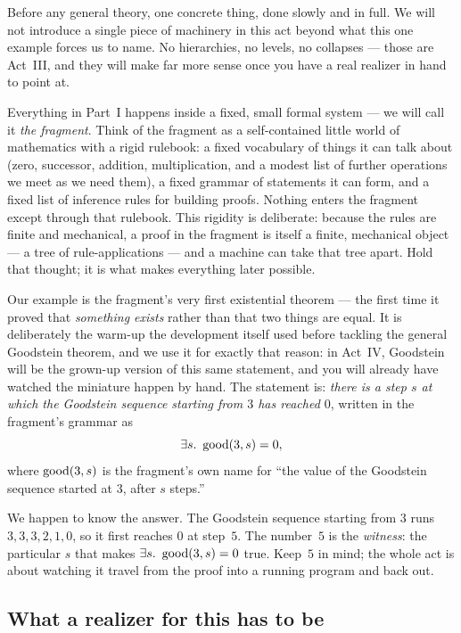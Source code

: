 \documentclass[11pt]{article}
\begin{document}
Before any general theory, one concrete thing, done slowly and in full. We
will not introduce a single piece of machinery in this act beyond what this
one example forces us to name. No hierarchies, no levels, no collapses ---
those are Act~III, and they will make far more sense once you have a real
realizer in hand to point at.

Everything in Part~I happens inside a fixed, small formal system --- we
will call it \emph{the fragment}. Think of the fragment as a self-contained
little world of mathematics with a rigid rulebook: a fixed vocabulary of
things it can talk about (zero, successor, addition, multiplication, and a
modest list of further operations we meet as we need them), a fixed grammar
of statements it can form, and a fixed list of inference rules for building
proofs. Nothing enters the fragment except through that rulebook. This
rigidity is deliberate: because the rules are finite and mechanical, a proof
in the fragment is itself a finite, mechanical object --- a tree of
rule-applications --- and a machine can take that tree apart. Hold that
thought; it is what makes everything later possible.

Our example is the fragment's very first existential theorem --- the first
time it proved that \emph{something exists} rather than that two things are
equal. It is deliberately the warm-up the development itself used before
tackling the general Goodstein theorem, and we use it for exactly that
reason: in Act~IV, Goodstein will be the grown-up version of this same
statement, and you will already have watched the miniature happen by hand.
The statement is: \emph{there is a step $s$ at which the Goodstein sequence
starting from $3$ has reached $0$}, written in the fragment's grammar as
\[
  \exists s.\ \operatorname{good}(3,s)=0,
\]
where $\operatorname{good}(3,s)$ is the fragment's own name for ``the value of the
Goodstein sequence started at $3$, after $s$ steps.''

We happen to know the answer. The Goodstein sequence starting from $3$ runs
$3,3,3,2,1,0$, so it first reaches $0$ at step~$5$. The number~$5$ is the
\emph{witness}: the particular $s$ that makes $\exists s.\ \operatorname{good}(3,s)=0$
true. Keep~$5$ in mind; the whole act is about watching it travel from the
proof into a running program and back out.

\subsection*{What a realizer for this has to be}
\end{document}
